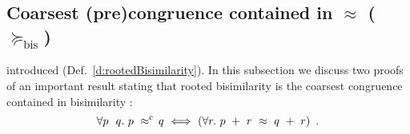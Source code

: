 
\subsection{Coarsest (pre)congruence contained in $\approx$ ($\succeq_{\mathrm{bis}}$)}
\label{s:coarsest}


introduced (Def.~\ref{d:rootedBisimilarity}).
In this subsection we discuss two proofs of an important result stating that
rooted bisimilarity is the coarsest congruence contained in
bisimilarity \cite{van2005characterisation,Gorrieri:2015jt,Mil89}:
\begin{equation}
\label{eq:coarsest}
\forall p\ \ q.\ p\ \rapprox\ \! q\ \Longleftrightarrow\ ( \forall r.\ p\ +\
r\ \approx\ q\ +\ r )\enspace.
\end{equation}



